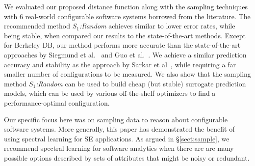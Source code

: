 \documentclass{newsig}
\newcommand{\tion}[1]{\S\ref{sect:#1}}
\begin{document}
We evaluated our proposed distance function along with the sampling techniques with 6 real-world configurable software systems borrowed from the literature. The recommended method \textit{$S_1$:Random} achieves similar to lower error rates, while being stable, when compared our results to the state-of-the-art methods. 
Except for Berkeley DB, our method performs more accurate than the state-of-the-art approaches by Siegmund et al.~\cite{siegmund2012predicting} and Guo et al.~\cite{guo2013variability}. We achieve a similar prediction accuracy and stability as the approach by Sarkar et al~\cite{sarkar2015cost}, while requiring a far smaller number of configurations to be measured. We also show that the sampling method \textit{$S_1$:Random} can be used to build cheap (but stable) surrogate prediction models, which can be used by various off-the-shelf optimizers to find a performance-optimal configuration. 

Our specific focus here was on sampling data
to reason about configurable software systems. More generally,
this paper has demonstrated the benefit of using
spectral learning for SE applications.  As argued in \tion{sample},
we recommend spectral learning  for software analytics when there are
are many possible options described by sets of attributes
that might be noisy or redundant.  



\vspace*{0.5mm}
 
 


\balance
  
\end{document}
